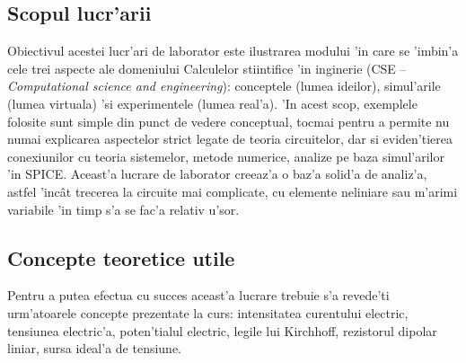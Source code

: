 \subsection*{Scopul lucr'arii}

Obiectivul acestei lucr'ari de laborator este ilustrarea modului 'in care se 'imbin'a cele trei aspecte ale domeniului Calculelor stiintifice 'in inginerie (CSE -- \textit{Computational science and engineering}): conceptele (lumea ideilor), simul'arile (lumea virtuala) 'si experimentele (lumea real'a). 'In acest scop, exemplele folosite sunt simple din punct de vedere conceptual, tocmai pentru a permite nu numai explicarea aspectelor strict legate de teoria circuitelor, dar si eviden'tierea conexiunilor cu teoria sistemelor, metode numerice, analize pe baza simul'arilor 'in SPICE. Aceast'a lucrare de laborator creeaz'a o baz'a solid'a de analiz'a, astfel 'inc\^at trecerea la circuite mai complicate, cu elemente neliniare sau m'arimi variabile 'in timp s'a se fac'a relativ u'sor.

\subsection*{Concepte teoretice utile}

Pentru a putea efectua cu succes aceast'a lucrare trebuie s'a revede'ti urm'atoarele concepte prezentate la curs: intensitatea curentului electric, tensiunea electric'a, poten'tialul electric, legile lui Kirchhoff, rezistorul dipolar liniar, sursa ideal'a de tensiune. 


